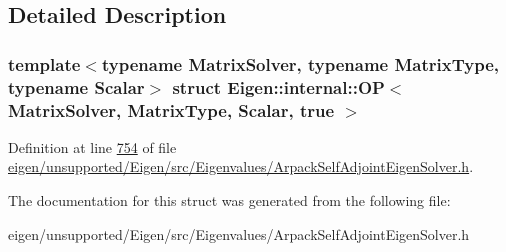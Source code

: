 \subsection{Detailed Description}
\subsubsection*{template$<$typename Matrix\+Solver, typename Matrix\+Type, typename Scalar$>$\newline
struct Eigen\+::internal\+::\+O\+P$<$ Matrix\+Solver, Matrix\+Type, Scalar, true $>$}



Definition at line \hyperlink{eigen_2unsupported_2_eigen_2src_2_eigenvalues_2_arpack_self_adjoint_eigen_solver_8h_source_l00754}{754} of file \hyperlink{eigen_2unsupported_2_eigen_2src_2_eigenvalues_2_arpack_self_adjoint_eigen_solver_8h_source}{eigen/unsupported/\+Eigen/src/\+Eigenvalues/\+Arpack\+Self\+Adjoint\+Eigen\+Solver.\+h}.



The documentation for this struct was generated from the following file\+:\begin{DoxyCompactItemize}
\item 
eigen/unsupported/\+Eigen/src/\+Eigenvalues/\+Arpack\+Self\+Adjoint\+Eigen\+Solver.\+h\end{DoxyCompactItemize}
